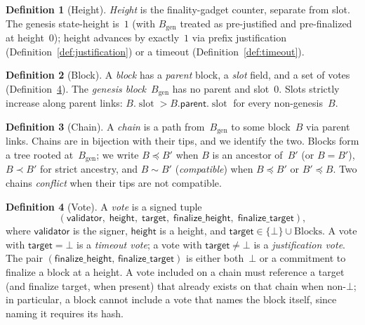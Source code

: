 \ifx\litemode\undefined\documentclass{article}\fi
\newcommand{\genesis}{\ensuremath{B_{\mathrm{gen}}}}
\newcommand{\slot}[0]{\ensuremath{\operatorname{\mathrm{slot}}}}
\newcommand{\target}{\mathsf{target}}
\newcommand{\height}{\mathsf{height}}
\newcommand{\validator}{\mathsf{validator}}
\newcommand{\parent}{\mathsf{parent}}
\newcommand{\finalizeHeight}{\mathsf{finalize\_height}}
\newcommand{\finalizeTarget}{\mathsf{finalize\_target}}
\theoremstyle{plain}
\theoremstyle{definition}
\newtheorem{definition}{Definition}
\theoremstyle{remark}
\begin{document}
\begin{definition}[Height]\label{def:height}
\emph{Height} is the finality-gadget counter, separate from slot.
The genesis state-height is~$1$ (with $\genesis$ treated as pre-justified and pre-finalized at height~$0$); height advances by exactly~$1$ via prefix justification (Definition~\ref{def:justification}) or a timeout (Definition~\ref{def:timeout}).
\end{definition}

\begin{definition}[Block]\label{def:block}
A \emph{block} has a \emph{parent} block, a \emph{slot} field, and a set of votes (Definition~\ref{def:vote}).
The \emph{genesis block}~$\genesis$ has no parent and slot~$0$.
Slots strictly increase along parent links: $B.\slot > B.\parent.\slot$ for every non-genesis~$B$.
\end{definition}

\begin{definition}[Chain]\label{def:chain}
A \emph{chain} is a path from~$\genesis$ to some block~$B$ via parent links.
Chains are in bijection with their tips, and we identify the two.
Blocks form a tree rooted at~$\genesis$; we write $B \preceq B'$ when $B$ is an ancestor of~$B'$ (or $B = B'$), $B \prec B'$ for strict ancestry, and $B \sim B'$ (\emph{compatible}) when $B \preceq B'$ or $B' \preceq B$.
Two chains \emph{conflict} when their tips are not compatible.
\end{definition}

\begin{definition}[Vote]\label{def:vote}
A \emph{vote} is a signed tuple
\[
  (\validator,\; \height,\; \target,\; \finalizeHeight,\; \finalizeTarget),
\]
where $\validator$ is the signer, $\height$ is a height, and $\target \in \{\bot\} \cup \mathrm{Blocks}$.
A vote with $\target = \bot$ is a \emph{timeout vote}; a vote with $\target \neq \bot$ is a \emph{justification vote}.
The pair $(\finalizeHeight,\, \finalizeTarget)$ is either both~$\bot$ or a commitment to finalize a block at a height.
A vote included on a chain must reference a target (and finalize target, when present) that already exists on that chain when non-$\bot$; in particular, a block cannot include a vote that names the block itself, since naming it requires its hash.
\end{definition}
\end{document}

